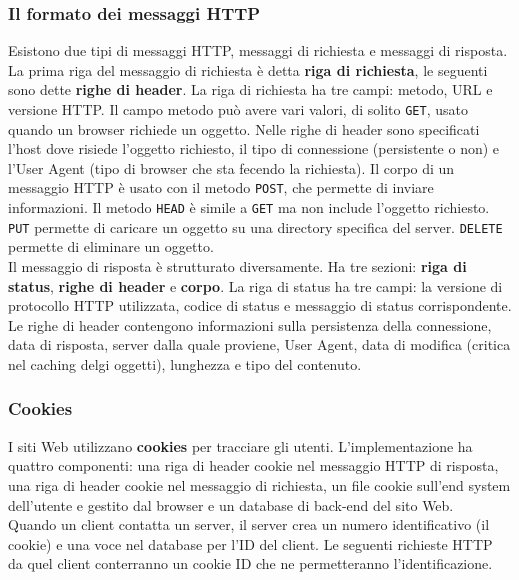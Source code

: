 \documentclass[11pt]{article}
\begin{document}
\subsubsection{Il formato dei messaggi HTTP}
Esistono due tipi di messaggi HTTP, messaggi di richiesta e messaggi di risposta.\\
La prima riga del messaggio di richiesta è detta \textbf{riga di richiesta}, le seguenti sono dette \textbf{righe di 
header}. La riga di richiesta ha tre campi: metodo, URL e versione HTTP. Il campo metodo può avere vari valori, di solito
\texttt{GET}, usato quando un browser richiede un oggetto.
Nelle righe di header sono specificati l'host dove risiede l'oggetto richiesto, il tipo di connessione (persistente o non)
e l'User Agent (tipo di browser che sta fecendo la richiesta). Il corpo di un messaggio HTTP è usato con il metodo 
\texttt{POST}, che permette di inviare informazioni. Il metodo \texttt{HEAD} è simile a \texttt{GET} ma non include 
l'oggetto richiesto. \texttt{PUT} permette di caricare un oggetto su una directory specifica del server. \texttt{DELETE}
permette di eliminare un oggetto.\\
Il messaggio di risposta è strutturato diversamente. Ha tre sezioni: \textbf{riga di status}, \textbf{righe di header}
e \textbf{corpo}. La riga di status ha tre campi: la versione di protocollo HTTP utilizzata, codice di status e messaggio
di status corrispondente. Le righe di header contengono informazioni sulla persistenza della connessione, data di
risposta, server dalla quale proviene, User Agent, data di modifica (critica nel caching delgi oggetti), lunghezza e 
tipo del contenuto.
\subsubsection{Cookies}
I siti Web utilizzano \textbf{cookies} per tracciare gli utenti. L'implementazione ha quattro componenti: una riga di header 
cookie nel messaggio HTTP di risposta, una riga di header cookie nel messaggio di richiesta, un file cookie sull'end 
system dell'utente e gestito dal browser e un database di back-end del sito Web.\\
Quando un client contatta un server, il server crea un numero identificativo (il cookie) e una voce nel database per l'ID 
del client. Le seguenti richieste HTTP da quel client conterranno un cookie ID che ne permetteranno l'identificazione.
\end{document}
